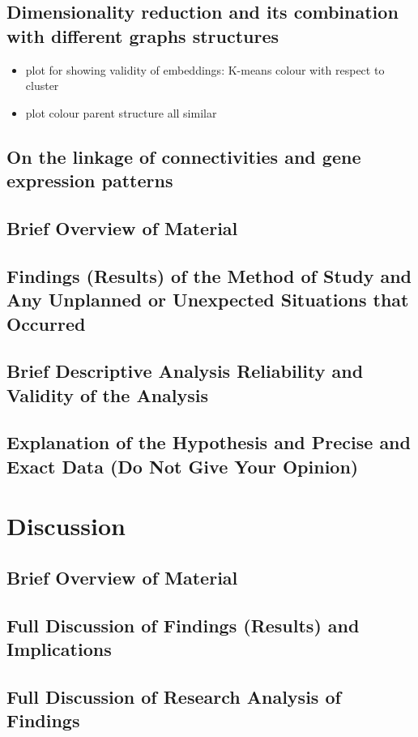 \documentclass[]{article}
\begin{document}
\subsection{Dimensionality reduction and its combination with different graphs structures}

\begin{itemize}
	\item plot for showing validity of embeddings: K-means colour with respect to cluster 
	\item plot colour parent structure all similar
\end{itemize}

\subsection{On the linkage of connectivities and gene expression patterns}

\subsection*{Brief Overview of Material}
\subsection*{Findings (Results) of the Method of Study and Any Unplanned or Unexpected Situations that Occurred}
\subsection*{Brief Descriptive Analysis
Reliability and Validity of the Analysis}
\subsection*{Explanation of the Hypothesis and Precise and Exact Data (Do Not Give Your Opinion)}


\newpage
\section{Discussion}
\label{sec:discussion}
\subsection*{Brief Overview of Material}
\subsection*{Full Discussion of Findings (Results) and Implications}
\subsection*{Full Discussion of Research Analysis of Findings}
\end{document}
